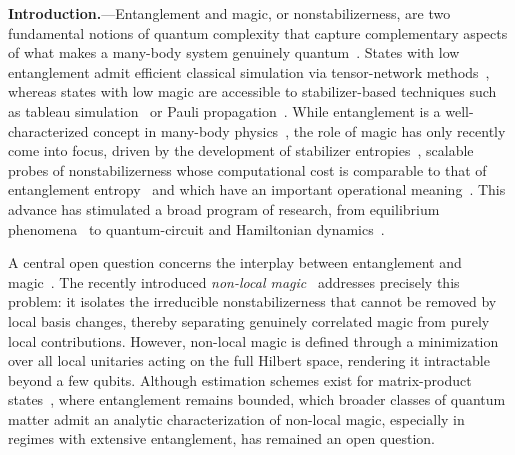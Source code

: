 \documentclass[aps,prl,twocolumn,superscriptaddress,reprint,longbibliography,nofootinbib]{revtex4-2}
\begin{document}
\textbf{Introduction.}---Entanglement and magic, or nonstabilizerness, are two fundamental notions of quantum complexity that capture complementary aspects of what makes a many-body system genuinely quantum~\cite{Horodecki2009,Chitambar2019resources,Veitch2014resource}.
States with low entanglement admit efficient classical simulation via tensor-network methods~\cite{Schollw_ck_2011}, whereas states with low magic are accessible to stabilizer-based techniques such as tableau simulation~\cite{Gottesman1998,Bravyi2019simulationofquantum} or Pauli propagation~\cite{dowling2025magic,rudolph2025paulipropagationcomputationalframework}.
While entanglement is a well-characterized concept in many-body physics~\cite{Laflorencie_2016,amico2008entanglement}, the role of magic has only recently come into focus, driven by the development of stabilizer entropies~\cite{Leone2022SRE,leone2024stabilizer}, scalable probes of nonstabilizerness whose computational cost is comparable to that of entanglement entropy~\cite{huang2026fastexactapproachstabilizer,xiao2026exponentiallyacceleratedsamplingpauli,sierant2026computingquantummagicstate} and which have an important operational meaning~\cite{Bittel_2026, Iannotti_2026, cusumano2025nonstabilizernessviolationschshinequalities}.
This advance has stimulated a broad program of research, from equilibrium phenomena~\cite{piro2,tarabunga2023manybody,oshino2026stabilizer,hoshino2025stabilizerrenyientropyencodes, aditya2025mpembaeffectsquantumcomplexity} to quantum-circuit and Hamiltonian dynamics~\cite{Turkeshi_2025,odavic2025stabilizer,tirrito2025anticoncentration,falcao2025nonstabilizerness, PhysRevB.106.214316, p8dn-glcw, lio2026quantumstatedesignsmagic, aditya2025growthspreadingquantumresources, Viscardi_2026}.

A central open question concerns the interplay between entanglement and magic~\cite{tirrito2024quantifying,szombathy,Iannotti2025entanglement}.
The recently introduced \emph{non-local magic}~\cite{Cao_2025,qian2025quantumnonlocalnonstabilizerness, munizzi2026magicnoncliffordgatestopological, cao2024non} addresses precisely this problem: it isolates the irreducible nonstabilizerness that cannot be removed by local basis changes, thereby separating genuinely correlated magic from purely local contributions.
However, non-local magic is defined through a minimization over all local unitaries acting on the full Hilbert space, rendering it intractable beyond a few qubits.
Although estimation schemes exist for matrix-product states~\cite{Cao_2025}, where entanglement remains bounded, which broader classes of quantum matter admit an analytic characterization of non-local magic, especially in regimes with extensive entanglement, has remained an open question.
\end{document}
